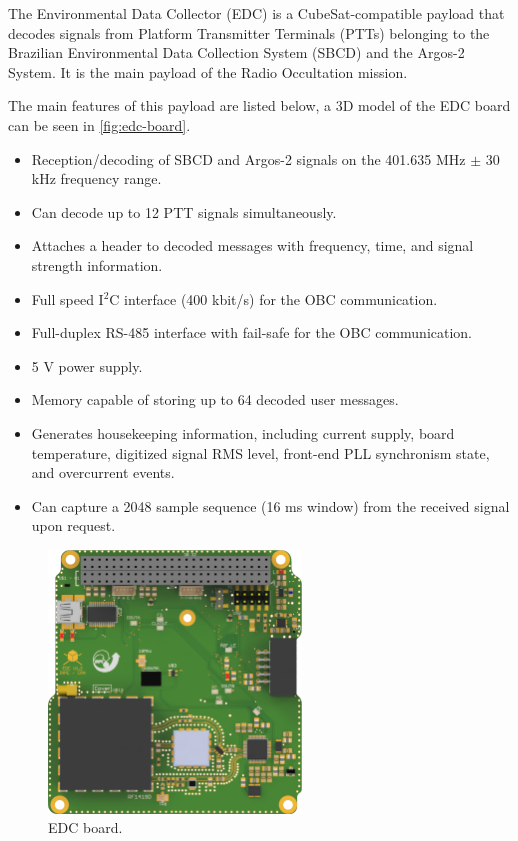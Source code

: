 The Environmental Data Collector (EDC) is a CubeSat-compatible payload that decodes signals from Platform Transmitter Terminals (PTTs) belonging to the Brazilian Environmental Data Collection System (SBCD) and the Argos-2 System. It is the main payload of the Radio Occultation mission.

The main features of this payload are listed below, a 3D model of the EDC board can be seen in \autoref{fig:edc-board}.

\begin{itemize}
    \item Reception/decoding of SBCD and Argos-2 signals on the 401.635 MHz $\pm$ 30 kHz frequency range.
    \item Can decode up to 12 PTT signals simultaneously.
    \item Attaches a header to decoded messages with frequency, time, and signal strength information.
    \item Full speed I$^{2}$C interface (400 kbit/s) for the OBC communication.
    \item Full-duplex RS-485 interface with fail-safe for the OBC communication.
    \item 5 V power supply.
    \item Memory capable of storing up to 64 decoded user messages.
    \item Generates housekeeping information, including current supply, board temperature, digitized signal RMS level, front-end PLL synchronism state, and overcurrent events.
    \item Can capture a 2048 sample sequence (16 ms window) from the received signal upon request.
\end{itemize}

\begin{figure}[!ht]
    \begin{center}
        \includegraphics[width=0.6\textwidth]{figures/subsystems/edc-pcb-top}
        \caption{EDC board.}
        \label{fig:edc-board}
    \end{center}
\end{figure}

